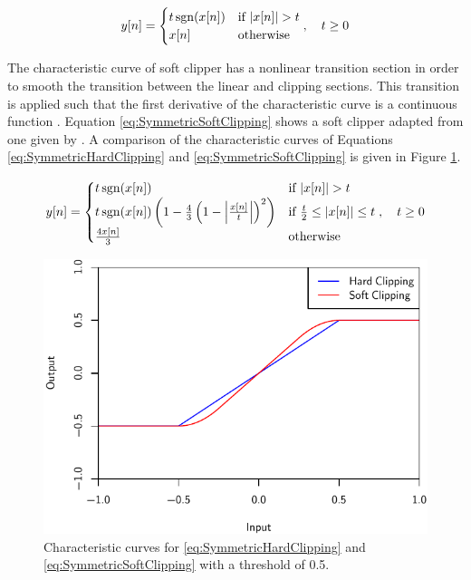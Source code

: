 		\begin{equation}
			y[n] = \begin{cases}
				t\operatorname{sgn}(x[n]) & \text{if $\left|x[n]\right| > t$} \\
				x[n] & \text{otherwise}
			\end{cases}, \quad t \geq 0
			\label{eq:SymmetricHardClipping}
		\end{equation}
		
		The characteristic curve of soft clipper has a nonlinear transition section in order to smooth the
		transition between the linear and clipping sections. This transition is applied such that the first
		derivative of the characteristic curve is a continuous function \citep{esqueda2015aliasing}. Equation
		\ref{eq:SymmetricSoftClipping} shows a soft clipper adapted from one given by
		\citet{dutilleux2011nonlinear}. A comparison of the characteristic curves of Equations
		\ref{eq:SymmetricHardClipping} and \ref{eq:SymmetricSoftClipping} is given in Figure \ref{fig:Clipping}.

		\begin{equation}
			y[n] = \begin{cases}
				t\operatorname{sgn}(x[n]) & \text{if $\left|x[n]\right| > t$} \\
				t\operatorname{sgn}(x[n]) \left( 1 - \frac{4}{3} \left( 1 - \left|\frac{x[n]}{t}\right| \right)^{2}
				           \right) & \text{if $\frac{t}{2} \leq \left|x[n]\right| \leq t$} \\
				\frac{4x[n]}{3} & \text{otherwise}
			\end{cases}, \quad t \geq 0
			\label{eq:SymmetricSoftClipping}
		\end{equation}

		\begin{figure}[h!]
			\centering
			\includegraphics{chapter3/Images/Clipping.pdf}
			\caption{Characteristic curves for \ref{eq:SymmetricHardClipping} and
				 \ref{eq:SymmetricSoftClipping} with a threshold of 0.5.}
			\label{fig:Clipping}
		\end{figure}

